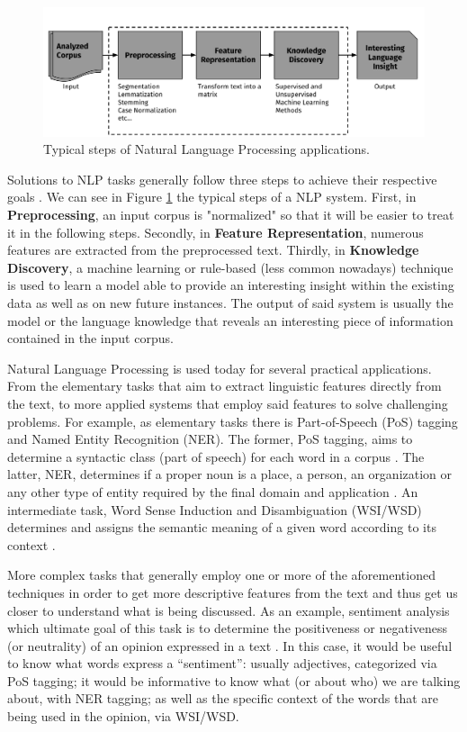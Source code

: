 %
\begin{figure}
\centering
\includegraphics[width=1\linewidth]{./images/Chapitre1/nlp_flow.pdf}
\caption{Typical steps of Natural Language Processing applications.}
\label{fig:nlpflow}
\end{figure}
Solutions to NLP tasks generally follow three steps to achieve their respective goals \cite{mining12Book,JurafskyM09}. We can see in Figure \ref{fig:nlpflow}  the typical steps of a NLP system.  First, in \textbf{Preprocessing}, an input corpus is "normalized" so that it will be easier to treat it in the following steps. Secondly, in \textbf{Feature Representation}, numerous features are extracted from the preprocessed text. Thirdly, in \textbf{Knowledge Discovery},  a machine learning or rule-based (less common nowadays) technique is used to  learn a model able to provide an interesting insight within the existing data as well as on new future instances. The output of said system is usually the model or the language knowledge that reveals an interesting piece of information contained in the input corpus. 

Natural Language Processing is used today for several practical applications. From the elementary tasks that aim to extract linguistic features directly from the text, to more applied systems that employ said features to solve challenging problems. For example, as elementary tasks there is Part-of-Speech (PoS) tagging and Named Entity Recognition (NER). The former, PoS tagging, aims to determine a syntactic class (part of speech) for each word in a corpus \cite{JurafskyM09}. The latter, NER, determines if a proper noun is a place, a person, an organization or any other type of entity required by the final domain and application \cite{nadeau2007survey} . An intermediate task, Word Sense Induction and Disambiguation (WSI/WSD) determines and assigns the semantic meaning of a given word according to its context \cite{ClarkBook2010}.


More complex tasks that generally employ one or more of the aforementioned techniques in order to get more descriptive features from the text and thus get us closer to understand what is being discussed. As an example,  sentiment analysis which ultimate goal of this task is to determine the positiveness or negativeness (or neutrality) of an opinion expressed in a text \cite{liu2012survey}. In this case, it would be useful to know what words express a ``sentiment'': usually adjectives, categorized via PoS tagging; it would be informative to know what (or about who) we are talking about, with NER tagging; as well as the specific context of the words that are being used in the opinion, via WSI/WSD. 



